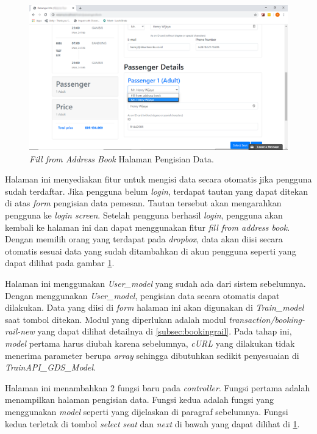 \begin{figure}[H]
        \center
        \includegraphics[width=\textwidth,height=\textheight,keepaspectratio]{Gambar/Fill from address book isi data.png}
        \caption{\textit{Fill from Address Book} Halaman Pengisian Data.}
            \label{img:fillfromisidata}
        \end{figure}

Halaman ini menyediakan fitur untuk mengisi data secara otomatis jika pengguna sudah terdaftar. Jika pengguna belum \textit{login}, terdapat tautan yang dapat ditekan di atas \textit{form} pengisian data pemesan. Tautan tersebut akan mengarahkan pengguna ke \textit{login screen}. Setelah pengguna berhasil \textit{login}, pengguna akan kembali ke halaman ini dan dapat menggunakan fitur \textit{fill from address book}. Dengan memilih orang yang terdapat pada \textit{dropbox}, data akan diisi secara otomatis sesuai data yang sudah ditambahkan di akun pengguna seperti yang dapat dilihat pada gambar \ref{img:fillfromisidata}.

Halaman ini menggunakan \textit{User\_model} yang sudah ada dari sistem sebelumnya. Dengan menggunakan \textit{User\_model}, pengisian data secara otomatis dapat dilakukan. Data yang diisi di \textit{form} halaman ini akan digunakan di \textit{Train\_model} saat tombol ditekan. Modul yang diperlukan adalah modul \textit{transaction/booking-rail-new} yang dapat dilihat detailnya di \ref{subsec:bookingrail}. Pada tahap ini, \textit{model} pertama harus diubah karena sebelumnya, \textit{cURL} yang dilakukan tidak menerima parameter berupa \textit{array} sehingga dibutuhkan sedikit penyesuaian di \textit{TrainAPI\_GDS\_Model}.

Halaman ini menambahkan 2 fungsi baru pada \textit{controller}. Fungsi pertama adalah menampilkan halaman pengisian data. Fungsi kedua adalah fungsi yang menggunakan \textit{model} seperti yang dijelaskan di paragraf sebelumnya. Fungsi kedua terletak di tombol \textit{select seat} dan \textit{next} di bawah yang dapat dilihat di \ref{img:fillfromisidata}.

